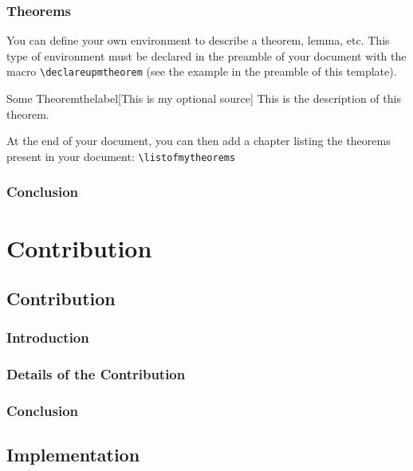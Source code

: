 \documentclass[english]{spimutbmphdthesis}
\begin{document}
\section{Theorems}

You can define your own environment to describe a theorem, lemma, etc.
This type of environment must be declared in the preamble of your document with the
macro \texttt{{\textbackslash}declareupmtheorem} (see the example in the preamble of
this template).

\begin{mytheorem}{Some Theorem}{thelabel}[This is my optional source]
	This is the description of this theorem.
\end{mytheorem}

At the end of your document, you can then add a chapter listing the theorems present in your document: \texttt{{\textbackslash}listofmytheorems}

\section{Conclusion}



\part{Contribution}

\chapter{Contribution}

\section{Introduction}

\section{Details of the Contribution}

\section{Conclusion}

\chapter{Implementation}
\end{document}
